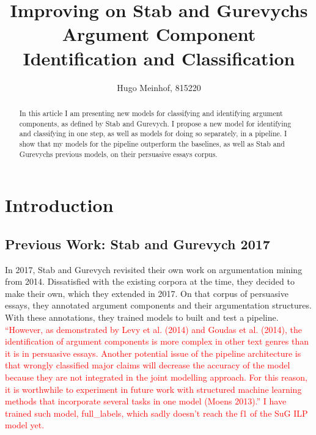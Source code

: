 \documentclass[12]{article}
\title{Improving on Stab and Gurevychs Argument Component Identification and Classification}
\author{Hugo Meinhof, 815220}
\theoremstyle{mytheoremstyle}
\theoremstyle{mytheoremstyle}
\theoremstyle{myproblemstyle}
\begin{document}
  \maketitle
  \begin{abstract}
  In this article I am presenting new models for classifying and identifying argument components, as defined by Stab and Gurevych\cite{stab-gurevych-2017-parsing}. I propose a new model for identifying and classifying in one step, as well as models for doing so separately, in a pipeline. I show that my models for the pipeline outperform the baselines, as well as Stab and Gurevychs previous models, on their persuasive essays corpus.
  \end{abstract}
  \section{Introduction\dotfill}
  \subsection{Previous Work: Stab and Gurevych 2017}
  In 2017, Stab and Gurevych\cite{stab-gurevych-2017-parsing} revisited their own work on argumentation mining from 2014. Dissatisfied with the existing corpora at the time, they decided to make their own, which they extended in 2017. On that corpus of persuasive essays, they annotated argument components and their argumentation structures. With these annotations, they trained models to built and test a pipeline. 
  \textcolor{red}{``However, as demonstrated by Levy et al. (2014) and Goudas et al.
(2014), the identification of argument components is more complex in other text genres
than it is in persuasive essays. Another potential issue of the pipeline architecture is that
wrongly classified major claims will decrease the accuracy of the model because they
are not integrated in the joint modelling approach. For this reason, it is worthwhile to
experiment in future work with structured machine learning methods that incorporate
several tasks in one model (Moens 2013).'' I have trained such model, full\_labels, which sadly doesn't reach the f1 of the SuG ILP model yet.}
\end{document}

